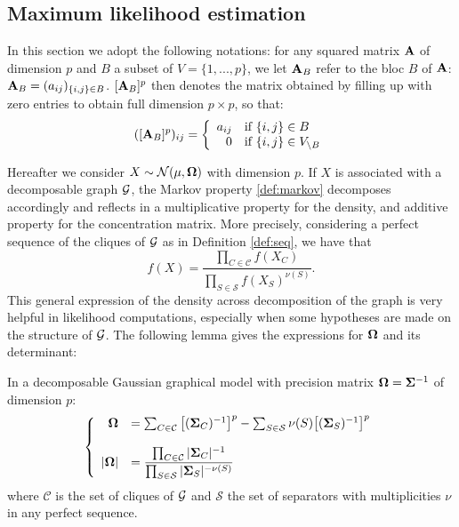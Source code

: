  \subsection{Maximum likelihood estimation}
In this section we adopt the following notations: for any  squared  matrix ${\bf A}$ of dimension $p$ and $B$ a subset of $V=\{1,...,p\}$, we let ${\bf A}_B$ refer to the bloc $B$ of ${\bf A}$: ${\bf A}_{B}=(a_{ij})_{\{i,j\}\in B}$.   $[{\bf A}_B]^p$ then denotes the matrix obtained by filling up with zero entries to obtain full dimension $p\times p$, so that:
$$([{\bf A}_B]^p )_{ij}=\left\{ \begin{array}{rl}
a_{ij} & \text{if } \{i,j\}\in B\\
0 &  \text{if } \{i,j\}\in V_{\setminus B}
\end{array}\right.$$

Hereafter we consider  $X\sim\mathcal{N} (\mu, {\boldsymbol{\Omega}})$ with dimension $p$. If $X$ is associated with a decomposable graph $\mathcal{G}$, the Markov property \ref{def:markov} decomposes accordingly and reflects in a multiplicative property for the density, and additive property for the concentration matrix. More precisely, considering a perfect sequence of the cliques of $\mathcal{G}$ as in Definition \ref{def:seq}, we have that
 $$f(X)=\dfrac{\prod_{C\in \mathcal{C}} f(X_C)}{\prod_{S\in \mathcal{S}} f(X_S)^{\nu(S)}}.$$
This general expression of the density across decomposition of the graph is very helpful in likelihood computations, especially when some hypotheses are made on the structure of $\mathcal{G}$. The following lemma gives the expressions for ${\boldsymbol{\Omega}}$ and its determinant:
 \begin{lemma} In a decomposable Gaussian graphical model with precision matrix ${\boldsymbol{\Omega}} = {\boldsymbol{\Sigma}}^{-1}$ of dimension $p$:
 \begin{equation*}
 \left\{
 \begin{array}{rl}
 {\boldsymbol{\Omega}} &= \sum_{C\in \mathcal{C}} \big[({\boldsymbol{\Sigma}}_C)^{-1}\big]^p - \sum_{S\in \mathcal{S}} \nu(S)  \big[({\boldsymbol{\Sigma}}_S)^{-1}\big]^p \\\\
 |{\boldsymbol{\Omega}}| &=\dfrac{\prod_{C\in \mathcal{C}} |{\boldsymbol{\Sigma}}_C|^{-1}}{\prod_{S\in \mathcal{S}} |{\boldsymbol{\Sigma}}_S|^{-\nu(S)}}
 \end{array} \right.
\end{equation*}  
where $\mathcal{C}$ is the set of cliques of $\mathcal{G}$ and $\mathcal{S}$ the set of separators with multiplicities $\nu$ in any perfect sequence. 
\end{lemma}

